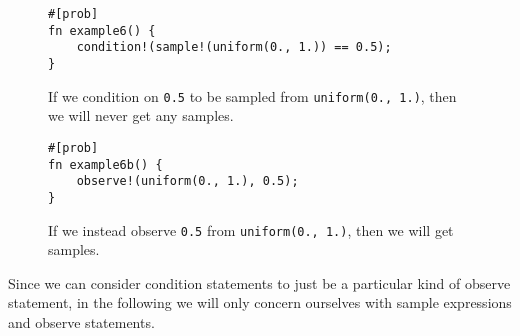\begin{figure}[h]
\begin{lstlisting}
#[prob]
fn example6() {
    condition!(sample!(uniform(0., 1.)) == 0.5);
}
\end{lstlisting}
\caption{If we condition on \lstinline{0.5} to be sampled from \lstinline{uniform(0., 1.)}, then we will never get any samples.}
\label{example6}
\end{figure}

\begin{figure}[h]
\begin{lstlisting}
#[prob]
fn example6b() {
    observe!(uniform(0., 1.), 0.5);
}
\end{lstlisting}
\caption{If we instead observe \lstinline{0.5} from \lstinline{uniform(0., 1.)}, then we will get samples.}
\label{example6b}
\end{figure}
            

Since we can consider condition statements to just be a particular kind of observe statement, in the following we will only concern ourselves with sample expressions and observe statements.
